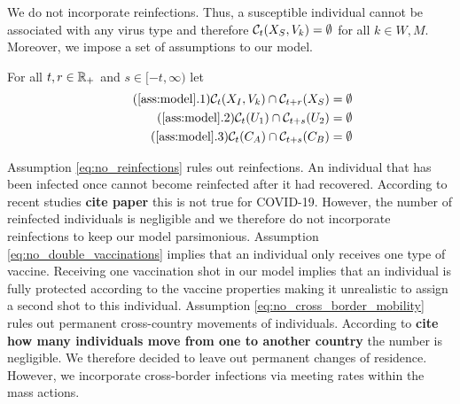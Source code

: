 We do not incorporate reinfections. Thus, a susceptible individual cannot be associated with any virus type and therefore $\mathcal{C}_t(X_S, V_k) = \emptyset$ for all $k \in {W,M}$. Moreover, we impose a set of assumptions to our model. 
\begin{assumption}\label{ass:model}
For all $t,r \in \mathbb{R}_+$ and $s \in [-t, \infty)$ let
\begin{align*}
\tag{\ref{ass:model}.1} 
\label{eq:no_reinfections}
\set(X_I, V_k) \cap \mathcal{C}_{t+r}(X_S) &= \emptyset \\
\tag{\ref{ass:model}.2} 
\label{eq:no_double_vaccinations}
\set(U_1) \cap \mathcal{C}_{t+s}(U_2) &= \emptyset \\
\tag{\ref{ass:model}.3} 
\label{eq:no_cross_border_mobility}
\set(C_A) \cap \mathcal{C}_{t+s}(C_B) &= \emptyset 
\end{align*}
\end{assumption}
Assumption \ref{eq:no_reinfections} rules out reinfections. An individual that has been infected once cannot become reinfected after it had recovered. According to recent studies \textbf{cite paper} this is not true for COVID-19. However, the number of reinfected individuals is negligible and we therefore do not incorporate reinfections to keep our model parsimonious. Assumption \ref{eq:no_double_vaccinations} implies that an individual only receives one type of vaccine. Receiving one vaccination shot in our model implies that an individual is fully protected according to the vaccine properties making it unrealistic to assign a second shot to this individual. Assumption \ref{eq:no_cross_border_mobility} rules out permanent cross-country movements of individuals. According to \textbf{cite how many individuals move from one to another country} the number is negligible. We therefore decided to leave out permanent changes of residence. However, we incorporate cross-border infections via meeting rates within the mass actions.


